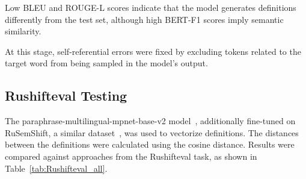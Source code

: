 \documentclass[11pt]{article}
\begin{document}

Low BLEU and ROUGE-L scores indicate that the model generates definitions differently from the test set,
although high BERT-F1 scores imply semantic similarity.


At this stage, self-referential errors were fixed by excluding tokens related to the target word from being sampled in the model's output.

\subsection{Rushifteval Testing}

The paraphrase-multilingual-mpnet-base-v2 model~\cite{Vectorizer}, additionally fine-tuned on RuSemShift, a similar dataset~\cite{rusemshift}, was used to vectorize definitions.
The distances between the definitions were calculated using the cosine distance.
Results were compared against approaches from the Rushifteval task,
as shown in Table~\ref{tab:Rushifteval_all}.
\end{document}
